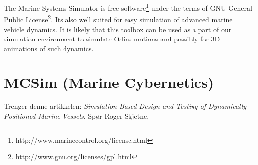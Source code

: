 The Marine Systems Simulator is free software\footnote{http://www.marinecontrol.org/license.html} under the terms of GNU General Public License\footnote{http://www.gnu.org/licenses/gpl.html}. Its also well suited for easy simulation of advanced marine vehicle dynamics. It is likely that this toolbox can be used as a part of our simulation environment to simulate Odins motions and possibly for 3D animations of such dynamics.

\section{MCSim (Marine Cybernetics)}
Trenger denne artikkelen: \textit{Simulation-Based Design
and Testing of Dynamically Positioned Marine Vessels}. Spør Roger Skjetne.




